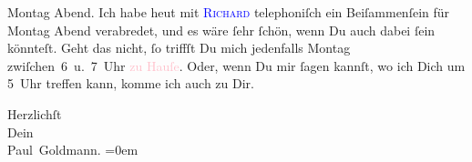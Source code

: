                   Montag{ }Abend. Ich habe heut mit \textsc{\textcolor{blue}{Richard}{}\ledrightnote{\textcolor{blue}{Richard Beer-Hofmann}}} telephoniſch ein Beiſammenſein für Montag{ }Abend verabredet, und es wäre ſehr ſchön, wenn Du auch dabei ſein
               könnteſt. Geht das nicht, ſo triffſt Du mich jedenfalls Montag{ }zwiſchen 6 u. 7 Uhr{ }\textcolor{pink}{zu Hauſe}{}\ledrightnote{{$\rightarrow$}\textcolor{pink}{Dessauer Straße}}. Oder, wenn Du mir
               ſagen kannſt, wo ich Dich um 5 Uhr treffen kann, komme ich auch zu
               Dir.\pend
           
\pstart
           Herzlichſt {\\[\baselineskip]}Dein {\\[\baselineskip]}\spacefill\mbox{Paul Goldmann.}\pend
           \leftskip=0em{}\endnumbering{}
\begin{anhang}
\end{anhang}
      